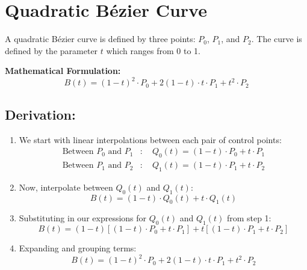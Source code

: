 \documentclass{article}
\begin{document}
\section*{Quadratic Bézier Curve}

A quadratic Bézier curve is defined by three points: \( P_0 \), \( P_1 \), and \( P_2 \). The curve is defined by the parameter \( t \) which ranges from 0 to 1.

\textbf{Mathematical Formulation:}
\[
B(t) = (1-t)^2 \cdot P_0 + 2(1-t) \cdot t \cdot P_1 + t^2 \cdot P_2
\]

\subsection*{Derivation:}

\begin{enumerate}
    \item We start with linear interpolations between each pair of control points:
    \begin{align*}
        \text{Between } P_0 \text{ and } P_1 &: \quad Q_0(t) = (1-t) \cdot P_0 + t \cdot P_1 \\
        \text{Between } P_1 \text{ and } P_2 &: \quad Q_1(t) = (1-t) \cdot P_1 + t \cdot P_2
    \end{align*}
    
    \item Now, interpolate between \( Q_0(t) \) and \( Q_1(t) \):
    \[
    B(t) = (1-t) \cdot Q_0(t) + t \cdot Q_1(t)
    \]
    
    \item Substituting in our expressions for \( Q_0(t) \) and \( Q_1(t) \) from step 1:
    \[
    B(t) = (1-t) \left[ (1-t) \cdot P_0 + t \cdot P_1 \right] + t \left[ (1-t) \cdot P_1 + t \cdot P_2 \right]
    \]
    
    \item Expanding and grouping terms:
    \[
    B(t) = (1-t)^2 \cdot P_0 + 2(1-t) \cdot t \cdot P_1 + t^2 \cdot P_2
    \]
\end{enumerate}
\end{document}
